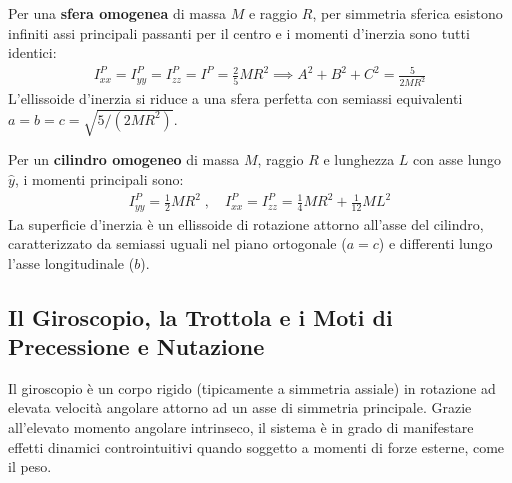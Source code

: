 Per una \textbf{sfera omogenea} di massa $M$ e raggio $R$, per simmetria sferica esistono infiniti assi principali passanti per il centro e i momenti d'inerzia sono tutti identici:
\begin{align*}
I_{xx}^P = I_{yy}^P = I_{zz}^P = I^P = \frac{2}{5} MR^2 \implies A^2 + B^2 + C^2 = \frac{5}{2MR^2}
\end{align*}
L'ellissoide d'inerzia si riduce a una sfera perfetta con semiassi equivalenti $a = b = c = \sqrt{5 / (2MR^2)}$.

Per un \textbf{cilindro omogeneo} di massa $M$, raggio $R$ e lunghezza $L$ con asse lungo $\hat{y}$, i momenti principali sono:
\begin{align*}
I_{yy}^P = \frac{1}{2} MR^2 \; , \quad I_{xx}^P = I_{zz}^P = \frac{1}{4} MR^2 + \frac{1}{12} ML^2
\end{align*}
La superficie d'inerzia è un ellissoide di rotazione attorno all'asse del cilindro, caratterizzato da semiassi uguali nel piano ortogonale ($a = c$) e differenti lungo l'asse longitudinale ($b$).






\subsection{Il Giroscopio, la Trottola e i Moti di Precessione e Nutazione}
Il giroscopio è un corpo rigido (tipicamente a simmetria assiale) in rotazione ad elevata velocità angolare attorno ad un asse di simmetria principale. Grazie all'elevato momento angolare intrinseco, il sistema è in grado di manifestare effetti dinamici controintuitivi quando soggetto a momenti di forze esterne, come il peso.

